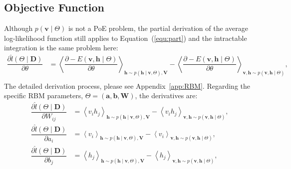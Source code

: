 \subsection{Objective Function}
	Although $ p(\mathbf{v} \mid \Theta) $ is not a PoE problem, the partial derivation of the average log-likelihood function still applies to Equation~(\ref{equ:part}) and the intractable integration is the same problem here:
	\begin{equation}
		\label{equ:RBM}
		\begin{aligned}
		\dfrac{\partial \hat{l} (\Theta \mid \mathbf{D})}{\partial \theta} 
		& = \left \langle \dfrac{\partial -E(\mathbf{v}, \mathbf{h} \mid \Theta)}{\partial \theta} \right \rangle_{\mathbf{h} \sim p( \mathbf{h} \mid \mathbf{v}, \Theta), \mathbf{V}} 
		- \left \langle \dfrac{\partial -E(\mathbf{v}, \mathbf{h} \mid \Theta)}{\partial \theta} \right \rangle_{\mathbf{v}, \mathbf{h} \sim p( \mathbf{v}, \mathbf{h} \mid  \Theta)},  \\
		\end{aligned}
	\end{equation}
	The detailed derivation process, please see Appendix~\ref{app:RBM}.
	Regarding the specific RBM parameters,  $ \Theta = (\mathbf{a}, \mathbf{b}, \mathbf{W}) $, the derivatives are:
	\begin{equation}
		\label{equ:RBM_2}
		\begin{aligned}
		\dfrac{\partial \hat{l} (\Theta \mid \mathbf{D})}{\partial W_{ij}} 
		& = \left \langle v_i h_j \right \rangle_{\mathbf{h} \sim p( \mathbf{h} \mid \mathbf{v}, \Theta), \mathbf{V}} 
		- \left \langle  v_i h_j \right \rangle_{\mathbf{v}, \mathbf{h} \sim p( \mathbf{v}, \mathbf{h} \mid  \Theta)},  \\
		\dfrac{\partial \hat{l} (\Theta \mid \mathbf{D})}{\partial a_{i}} 
		& = \left \langle v_i \right \rangle_{\mathbf{h} \sim p( \mathbf{h} \mid \mathbf{v}, \Theta), \mathbf{V}} 
		- \left \langle  v_i \right \rangle_{\mathbf{v}, \mathbf{h} \sim p( \mathbf{v}, \mathbf{h} \mid  \Theta)},  \\
		\dfrac{\partial \hat{l} (\Theta \mid \mathbf{D})}{\partial b_{j}} 
		& = \left \langle h_j \right \rangle_{\mathbf{h} \sim p( \mathbf{h} \mid \mathbf{v}, \Theta), \mathbf{V}} 
		- \left \langle  h_j \right \rangle_{\mathbf{v}, \mathbf{h} \sim p( \mathbf{v}, \mathbf{h} \mid  \Theta)},  \\
	\end{aligned}
	\end{equation}	 
	
